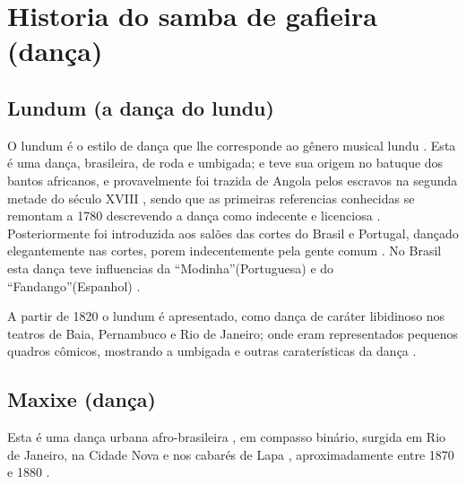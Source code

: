 

\chapter{Historia do samba de gafieira  (dança)}
\label{cap:sambagafieira}


\section{Lundum (a dança do lundu)} 
\label{sec:lundu}
O lundum é o estilo de dança que lhe corresponde ao gênero musical lundu \cite[pp. 18]{perna2002samba}.
Esta é uma dança, brasileira, de roda e umbigada; e teve sua origem no batuque dos bantos africanos,
e provavelmente foi trazida de Angola pelos escravos na segunda metade do século XVIII \cite[pp. 48]{tinhorao1986pequena} \cite[pp. 188]{dourado2004dicionario},
sendo que as primeiras referencias conhecidas se remontam a 1780 
descrevendo a dança como indecente e licenciosa \cite[pp. 51]{tinhorao1986pequena} \cite[pp. 19]{perna2002samba}.
Posteriormente foi introduzida aos salões das cortes do Brasil e Portugal, 
dançado elegantemente nas cortes, porem indecentemente pela gente comum   \cite[pp. 19]{perna2002samba} \cite[pp. 188]{dourado2004dicionario}.
No Brasil esta dança teve influencias da ``Modinha''(Portuguesa) e do ``Fandango''(Espanhol) \cite[pp. 188]{dourado2004dicionario}.

A partir de 1820 o lundum é apresentado, como dança de caráter libidinoso nos teatros de Baia, Pernambuco e Rio de Janeiro;
onde eram representados pequenos quadros cômicos, 
mostrando a umbigada e outras caraterísticas da dança \cite[pp. 19]{perna2002samba}.


\section{Maxixe (dança)}
\label{sec:maxixe}
Esta é uma dança urbana afro-brasileira \cite[pp. 4]{musicasambavariasdef1}, 
em compasso binário, surgida em Rio de Janeiro, 
na Cidade Nova e nos cabarés de Lapa \cite[pp. 465]{marcondes1977enciclopedia}  \cite[pp. 198]{dourado2004dicionario}, 
aproximadamente entre 1870 e 1880 \cite[pp. 58]{tinhorao1986pequena} \cite[pp. 465]{marcondes1977enciclopedia}  \cite[pp. 62]{reinato2010musica}.

